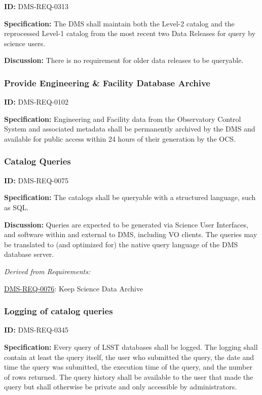 \documentclass[SE,toc,lsstdraft]{lsstdoc}
\begin{document}
\label{DMS-REQ-0313}
\textbf{ID:} DMS-REQ-0313

\textbf{Specification:} The DMS shall maintain both the Level-2 catalog and the reprocessed Level-1 catalog from the most recent two Data Releases for query by science users.

\textbf{Discussion: }There is no requirement for older data releases to be queryable.




\subsubsection{Provide Engineering \& Facility Database Archive}

\label{DMS-REQ-0102}
\textbf{ID:} DMS-REQ-0102

\textbf{Specification:} Engineering and Facility data from the Observatory Control System and associated metadata shall be permanently archived by the DMS and available for public access within 24 hours of their generation by the OCS.






\subsubsection{Catalog Queries}

\label{DMS-REQ-0075}
\textbf{ID:} DMS-REQ-0075

\textbf{Specification:} The catalogs shall be queryable with a structured language, such as SQL.

\textbf{Discussion:} Queries are expected to be generated via Science User Interfaces, and software within and external to DMS, including VO clients. The queries may be translated to (and optimized for) the native query language of the DMS database server.




\emph{Derived from Requirements:}

\hyperref[DMS-REQ-0076]{DMS-REQ-0076}:
Keep Science Data Archive \newline


\subsubsection{Logging of catalog queries}

\label{DMS-REQ-0345}
\textbf{ID:} DMS-REQ-0345

    \textbf{Specification: }Every query of LSST databases shall be logged. The logging shall contain at least the query itself, the user who submitted the query, the date and time the query was submitted, the execution time of the query, and the number of rows returned. The query history shall be available to the user that made the query but shall otherwise be private and only accessible by administrators.
\end{document}
